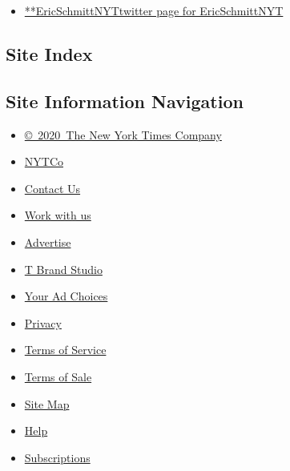 \begin{itemize}
\tightlist
\item
  \href{https://twitter.com/EricSchmittNYT}{**EricSchmittNYTtwitter page
  for EricSchmittNYT}
\end{itemize}

\hypertarget{site-index}{%
\subsection{Site Index}\label{site-index}}

\hypertarget{site-information-navigation}{%
\subsection{Site Information
Navigation}\label{site-information-navigation}}

\begin{itemize}
\tightlist
\item
  \href{https://help.nytimes3xbfgragh.onion/hc/en-us/articles/115014792127-Copyright-notice}{©~2020~The
  New York Times Company}
\end{itemize}

\begin{itemize}
\tightlist
\item
  \href{https://www.nytco.com/}{NYTCo}
\item
  \href{https://help.nytimes3xbfgragh.onion/hc/en-us/articles/115015385887-Contact-Us}{Contact
  Us}
\item
  \href{https://www.nytco.com/careers/}{Work with us}
\item
  \href{https://nytmediakit.com/}{Advertise}
\item
  \href{http://www.tbrandstudio.com/}{T Brand Studio}
\item
  \href{https://www.nytimes3xbfgragh.onion/privacy/cookie-policy\#how-do-i-manage-trackers}{Your
  Ad Choices}
\item
  \href{https://www.nytimes3xbfgragh.onion/privacy}{Privacy}
\item
  \href{https://help.nytimes3xbfgragh.onion/hc/en-us/articles/115014893428-Terms-of-service}{Terms
  of Service}
\item
  \href{https://help.nytimes3xbfgragh.onion/hc/en-us/articles/115014893968-Terms-of-sale}{Terms
  of Sale}
\item
  \href{https://spiderbites.nytimes3xbfgragh.onion}{Site Map}
\item
  \href{https://help.nytimes3xbfgragh.onion/hc/en-us}{Help}
\item
  \href{https://www.nytimes3xbfgragh.onion/subscription?campaignId=37WXW}{Subscriptions}
\end{itemize}
